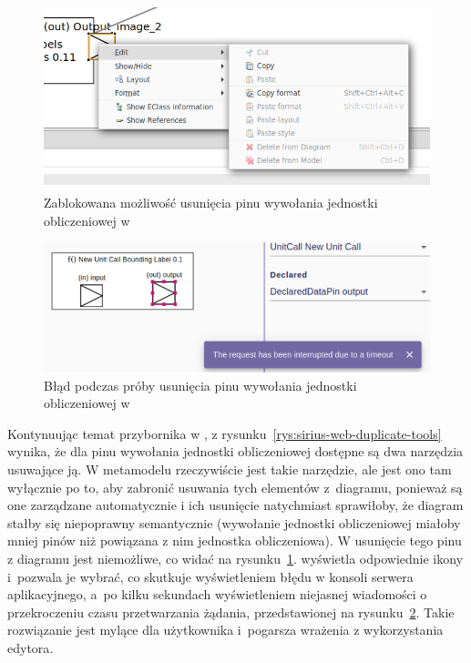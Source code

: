 \begin{figure}[!b]
  \centering

  \includegraphics[width=0.85\linewidth]{./images/sirius-desktop-blocked-deleting-pins.png}
  \caption{Zablokowana możliwość usunięcia pinu wywołania jednostki
    obliczeniowej w \SiriusDesktop{}}\label{rys:sirius-desktop-blocked-deleting-pins}
\end{figure}

\begin{figure}[!b]
  \centering

  \includegraphics[width=0.85\linewidth]{./images/sirius-web-timeout-when-deleting-pins.png}
  \caption{Błąd podczas próby usunięcia pinu wywołania jednostki obliczeniowej w
    \SiriusWeb{}}\label{rys:sirius-web-timeout-when-deleting-pins}
\end{figure}

Kontynuując temat przybornika w \SiriusWeb{}, z
rysunku~\ref{rys:sirius-web-duplicate-tools} wynika, że dla pinu wywołania
jednostki obliczeniowej dostępne są dwa narzędzia usuwające ją. W
metamodelu rzeczywiście jest takie narzędzie, ale jest ono tam wyłącznie po to,
aby zabronić usuwania tych elementów z~diagramu, ponieważ są one zarządzane
automatycznie i ich usunięcie natychmiast sprawiłoby, że diagram stałby
się niepoprawny semantycznie (wywołanie jednostki obliczeniowej miałoby mniej
pinów niż powiązana z nim jednostka obliczeniowa). W \SiriusDesktop{}
usunięcie tego pinu z diagramu jest niemożliwe, co widać na
rysunku~\ref{rys:sirius-desktop-blocked-deleting-pins}.
\SiriusWeb{} wyświetla odpowiednie ikony i~pozwala je wybrać, co skutkuje
wyświetleniem błędu w konsoli serwera aplikacyjnego, a~po kilku sekundach
wyświetleniem niejasnej wiadomości o przekroczeniu czasu przetwarzania żądania,
przedstawionej na rysunku~\ref{rys:sirius-web-timeout-when-deleting-pins}.
Takie rozwiązanie jest mylące dla użytkownika i~pogarsza wrażenia z
wykorzystania edytora.

